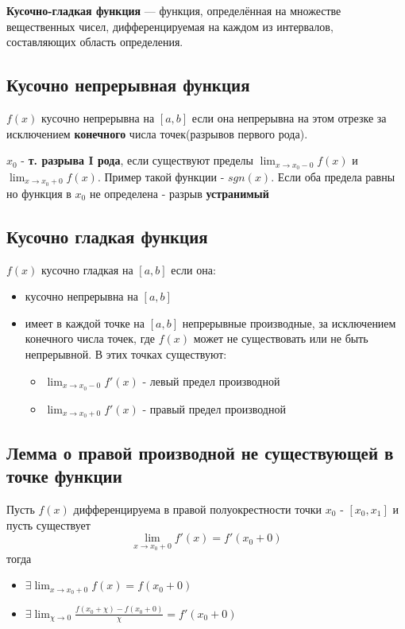 \textbf{Кусочно-гладкая функция} — функция, определённая на множестве вещественных чисел, дифференцируемая на каждом из интервалов, составляющих область определения.

\subsection{Кусочно непрерывная функция}

$f(x)$ кусочно непрерывна на $[a,b]$ если она непрерывна на этом отрезке за исключением \textbf{конечного} числа точек(разрывов первого рода).

$x_0$ - \textbf{т. разрыва I рода}, если существуют пределы $\lim_{x\to x_0-0}f(x)$ и $\lim_{x\to x_0+0}f(x)$. Пример такой функции - $sgn(x)$. Если оба предела равны но функция в $x_0$ не определена - разрыв \textbf{устранимый}

\subsection{Кусочно гладкая функция}

$f(x)$ кусочно гладкая на $[a,b]$ если она:
\begin{itemize}
  \item кусочно непрерывна на $[a,b]$
  \item имеет в каждой точке на $[a,b]$ непрерывные производные, за исключением конечного числа точек, где $f(x)$ может не существовать или не быть непрерывной. В этих точках существуют:
  \begin{itemize}
    \item $\lim_{x\to x_0-0}f'(x)$ - левый предел производной
    \item $\lim_{x\to x_0+0}f'(x)$ - правый предел производной
  \end{itemize}
\end{itemize}

\subsection{Лемма о правой производной не существующей в точке функции}

Пусть $f(x)$ дифференцируема в правой полуокрестности точки $x_0$ - $[x_0, x_1]$ и пусть существует 
$$\lim _{x\to x_0+0}f'(x) = f'(x_0+0)$$
тогда 
\begin{itemize}
\item $\exists \lim _{x\to x_0+0}f(x) = f(x_0+0)$
\item $\exists \lim _{\chi \to 0} \frac{f(x_0+\chi)-f(x_0+0)}{\chi} = f'(x_0+0)$
\end{itemize}

